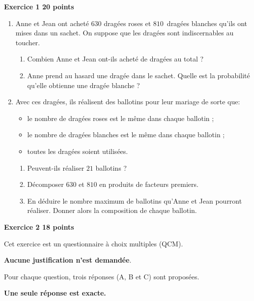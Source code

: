 \documentclass[11pt]{article}
\begin{document}
\bigskip

{\large \textbf{Exercice 1 \hfill 20 points}}

\medskip

\begin{enumerate}
\item Anne et Jean ont acheté $630$ dragées roses et $810$~dragées blanches qu'ils ont mises dans un sachet. On suppose que les dragées sont indiscernables au toucher.
	\begin{enumerate}
		\item Combien Anne et Jean ont-ils acheté de dragées au total ?
		\item Anne prend au hasard une dragée dans le sachet. Quelle est la probabilité qu'elle
obtienne une dragée blanche ?
	\end{enumerate}
\item Avec ces dragées, ils réalisent des ballotins pour leur mariage de sorte que: 
\begin{itemize}
\item le nombre de dragées roses est le même dans chaque ballotin ;
\item le nombre de dragées blanches est le même dans chaque ballotin ;
\item toutes les dragées soient utilisées.
\end{itemize}

	\begin{enumerate}
		\item Peuvent-ils réaliser $21$ ballotins ?
		\item Décomposer $630$ et $810$ en produits de facteurs premiers.
		\item En déduire le nombre maximum de ballotins qu'Anne et Jean pourront réaliser.
Donner alors la composition de chaque ballotin.
	\end{enumerate}
\end{enumerate}

\bigskip

{\large \textbf{Exercice 2 \hfill 18 points}}

\medskip

Cet exercice est un questionnaire à choix multiples (QCM).

\textbf{Aucune justification n'est demandée}.

Pour chaque question, trois réponses (A, B et C) sont proposées.

\textbf{Une seule réponse est exacte.}
\end{document}
